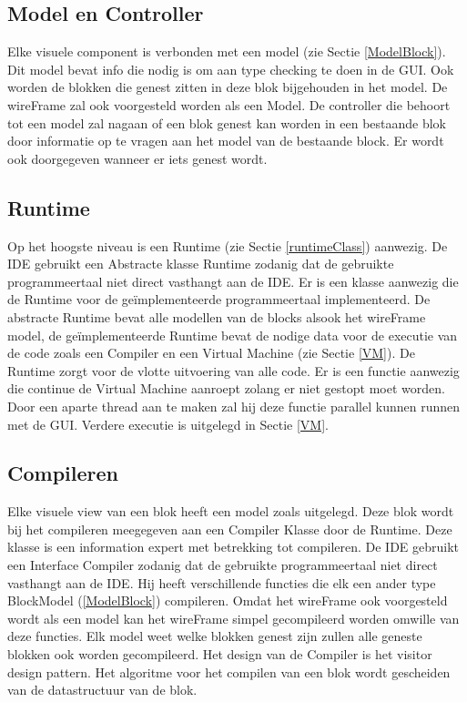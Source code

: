 \documentclass[]{article}
\begin{document}
\subsection{Model en Controller}
Elke visuele component is verbonden met een model (zie Sectie \ref{ModelBlock}). Dit model bevat info die nodig is om aan type checking te doen in de GUI. Ook worden de blokken die genest zitten in deze blok bijgehouden in het model. De wireFrame zal ook voorgesteld worden als een Model. De controller die behoort tot een model zal nagaan of een blok genest kan worden in een bestaande blok door informatie op te vragen aan het model van de bestaande block. Er wordt ook doorgegeven wanneer er iets genest wordt.

\subsection{Runtime}
\label{Runtime}
Op het hoogste niveau is een Runtime (zie Sectie \ref{runtimeClass}) aanwezig. De IDE gebruikt een Abstracte klasse Runtime zodanig dat de gebruikte programmeertaal niet direct vasthangt aan de IDE. Er is een klasse aanwezig die de Runtime voor de ge\"{i}mplementeerde programmeertaal implementeerd. De abstracte Runtime bevat alle modellen van de blocks alsook het wireFrame model, de ge\"{i}mplementeerde Runtime bevat de nodige data voor de executie van de code zoals een Compiler en een Virtual Machine (zie Sectie \ref{VM}). De Runtime zorgt voor de vlotte uitvoering van alle code. Er is een functie aanwezig die continue de Virtual Machine aanroept zolang er niet gestopt moet worden. Door een aparte thread aan te maken zal hij deze functie parallel kunnen runnen met de GUI. Verdere executie is uitgelegd in Sectie \ref{VM}.

\subsection{Compileren}
\label{Compileer}
Elke visuele view van een blok heeft een model zoals uitgelegd. Deze blok wordt bij het compileren meegegeven aan een Compiler Klasse door de Runtime. Deze klasse is een information expert met betrekking tot compileren. De IDE gebruikt een Interface Compiler zodanig dat de gebruikte programmeertaal niet direct vasthangt aan de IDE. Hij heeft verschillende functies die elk een ander type BlockModel (\ref{ModelBlock}) compileren. Omdat het wireFrame ook voorgesteld wordt als een model kan het wireFrame simpel gecompileerd worden omwille van deze functies. Elk model weet welke blokken genest zijn zullen alle geneste blokken ook worden gecompileerd. Het design van de Compiler is het visitor design pattern. Het algoritme voor het compilen van een blok wordt gescheiden van de datastructuur van de blok.  
\end{document}
